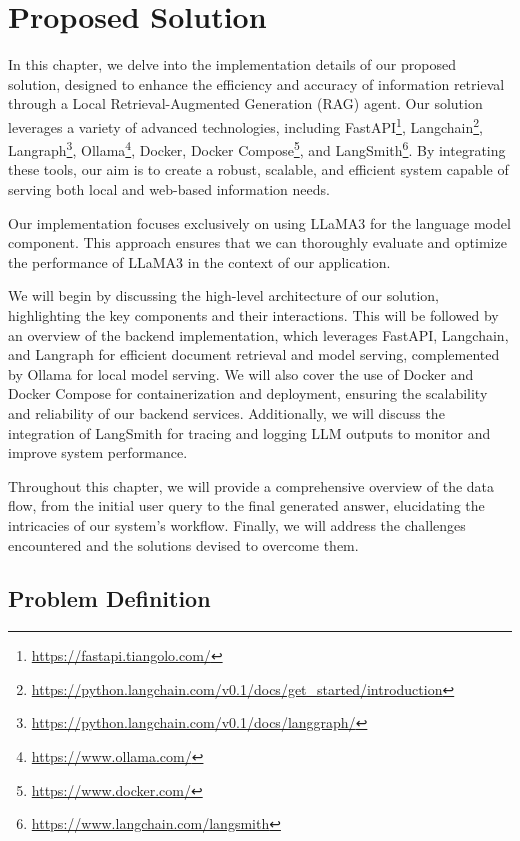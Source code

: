 \chapter{Proposed Solution}

\graphicspath{{contribution/figures/}}

In this chapter, we delve into the implementation details of our proposed solution, designed to enhance the efficiency and accuracy of information retrieval through a Local Retrieval-Augmented Generation (RAG) agent. Our solution leverages a variety of advanced technologies, including FastAPI\footnote{\url{https://fastapi.tiangolo.com/}}, Langchain\footnote{\url{https://python.langchain.com/v0.1/docs/get_started/introduction}}, Langraph\footnote{\url{https://python.langchain.com/v0.1/docs/langgraph/}}, Ollama\footnote{\url{https://www.ollama.com/}}, Docker, Docker Compose\footnote{\url{https://www.docker.com/}}, and LangSmith\footnote{\url{https://www.langchain.com/langsmith}}. By integrating these tools, our aim is to create a robust, scalable, and efficient system capable of serving both local and web-based information needs.

Our implementation focuses exclusively on using LLaMA3 for the language model component. This approach ensures that we can thoroughly evaluate and optimize the performance of LLaMA3 in the context of our application.

We will begin by discussing the high-level architecture of our solution, highlighting the key components and their interactions. This will be followed by an overview of the backend implementation, which leverages FastAPI, Langchain, and Langraph for efficient document retrieval and model serving, complemented by Ollama for local model serving. We will also cover the use of Docker and Docker Compose for containerization and deployment, ensuring the scalability and reliability of our backend services. Additionally, we will discuss the integration of LangSmith for tracing and logging LLM outputs to monitor and improve system performance.

Throughout this chapter, we will provide a comprehensive overview of the data flow, from the initial user query to the final generated answer, elucidating the intricacies of our system's workflow. Finally, we will address the challenges encountered and the solutions devised to overcome them.

\section{Problem Definition}

